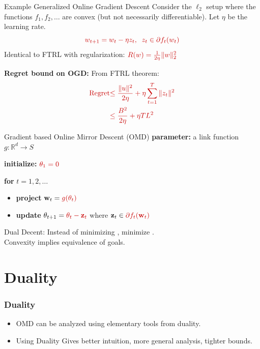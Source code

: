 \documentclass{beamer}
\newcommand{\mathred}[1]{\textcolor{mathred}{#1}}
\begin{document}
\begin{small}
\begin{frame}
\end{frame}


\begin{frame}{Example Generalized Online Gradient Descent}
  Consider the $\ell_2$ setup where the functions $f_1,f_2,\ldots$ are convex (but not necessarily differentiable).
  Let $\eta$ be the learning rate.
\[
  \mathred{w_{t+1} = w_t - \eta z_t,\;\;
    z_t \in \partial f_t(w_t)}
\]
Identical to FTRL with regularization: $\mathred{R(w) = \frac{1}{2\eta}\|w\|_2^2}$

{\bf Regret bound on OGD:} From FTRL theorem:
\begin{align*}
\mathred{\text{Regret}} &\mathred{\leq \frac{\|u\|^2}{2\eta} + \eta \sum_{t=1}^T \|z_t\|^2} \\
&\mathred{\leq \frac{B^2}{2\eta} + \eta T L^2}
\end{align*}
\end{frame}


\begin{frame}{Gradient based Online Mirror Descent (OMD)}
\textbf{parameter:} a link function \( g : \mathbb{R}^d \to S \)

\textbf{initialize:} \( \textcolor{mathcolor}{\theta_1 = 0} \)

\textbf{for} \( t = 1,2,\dots \)
\begin{itemize}
    \item \textbf{project} \( \mathbf{w}_t = \textcolor{mathcolor}{ g(\theta_t) } \)
    \item \textbf{update} \( \theta_{t+1} = \textcolor{mathcolor}{ \theta_t - \mathbf{z}_t } \) where \( \mathbf{z}_t \in \textcolor{mathcolor}{ \partial f_t(\mathbf{w}_t) } \)
    \end{itemize}
    Dual Decent: Instead of minimizing , minimize . \\
    Convexity implies equivalence of goals.
\end{frame}

\section{Duality}

\begin{frame}
  \frametitle{Duality}
  \begin{itemize}
  \item OMD can be analyzed using elementary tools from duality.
    \item Using Duality Gives better intuition, more general analysis, tighter bounds.
  \end{itemize}
\end{frame}


\end{small}
\end{document}
